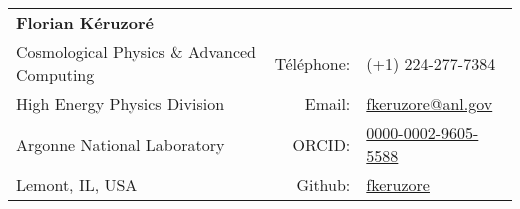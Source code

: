 \documentclass[12pt]{article}
\date{}
\begin{document}

\begin{table}[H]
{\def\arraystretch{1.2}\tabcolsep=3pt
    \begin{tabular}{p{.5\linewidth} r l}

    {\LARGE \bfseries \textcolor{maincolor}{Florian K\'eruzor\'e}} &  &  \\[15pt]
    Cosmological Physics \& Advanced Computing & Téléphone: & (+1) 224-277-7384 \\
    High Energy Physics Division & Email: & \href{mailto:fkeruzore@anl.gov}{fkeruzore@anl.gov} \\
    Argonne National Laboratory & ORCID: & \href{https://orcid.org/0000-0002-9605-5588}{0000-0002-9605-5588} \\
    Lemont, IL, USA & Github: & \href{https://github.com/fkeruzore}{fkeruzore}
\end{tabular}}
\end{table}
\vspace{-15pt}






\newpage






\newpage




%
\end{document}
